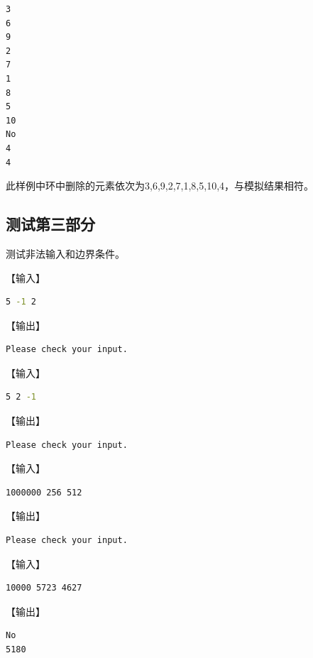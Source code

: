 \documentclass{article}
\begin{document}
\begin{lstlisting}[language={bash},
    basicstyle=\small\consolas]
3
6
9
2
7
1
8
5
10
No
4
4
\end{lstlisting}

此样例中环中删除的元素依次为3,6,9,2,7,1,8,5,10,4，与模拟结果相符。

\subsection{测试第三部分}

测试非法输入和边界条件。

【输入】

\begin{lstlisting}[language={bash},
    basicstyle=\small\consolas]
5 -1 2
\end{lstlisting}

【输出】

\begin{lstlisting}[language={bash},
    basicstyle=\small\consolas]
Please check your input.
\end{lstlisting}

【输入】

\begin{lstlisting}[language={bash},
    basicstyle=\small\consolas]
5 2 -1
\end{lstlisting}

【输出】

\begin{lstlisting}[language={bash},
    basicstyle=\small\consolas]
Please check your input.
\end{lstlisting}

【输入】

\begin{lstlisting}[language={bash},
    basicstyle=\small\consolas]
1000000 256 512
\end{lstlisting}

【输出】

\begin{lstlisting}[language={bash},
    basicstyle=\small\consolas]
Please check your input.
\end{lstlisting}

【输入】

\begin{lstlisting}[language={bash},
    basicstyle=\small\consolas]
10000 5723 4627
\end{lstlisting}

【输出】

\begin{lstlisting}[language={bash},
    basicstyle=\small\consolas]
No
5180
\end{lstlisting}
\end{document}
